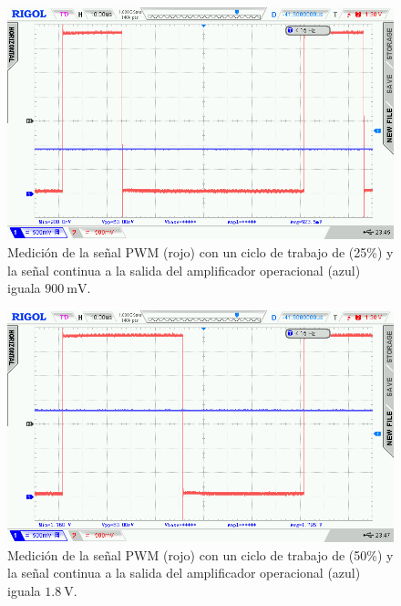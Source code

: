 \begin{figure}[H]
    \centering
    \includegraphics[width=0.9\linewidth]{Figuras/datalogger/Hardware/MedicionesPWM/63.png}
    \caption{Medición de la señal PWM (rojo) con un ciclo de trabajo de (25\%) y la señal continua a la salida del amplificador operacional (azul) iguala $\SI{900}{\milli\volt}$.}
    \label{fig:63}
\end{figure}


\begin{figure}[H]
    \centering
    \includegraphics[width=0.9\linewidth]{Figuras/datalogger/Hardware/MedicionesPWM/127.png}
    \caption{Medición de la señal PWM (rojo) con un ciclo de trabajo de (50\%) y la señal continua a la salida del amplificador operacional (azul) iguala $\SI{1.8}{\volt}$. }
    \label{fig:127}
\end{figure}


